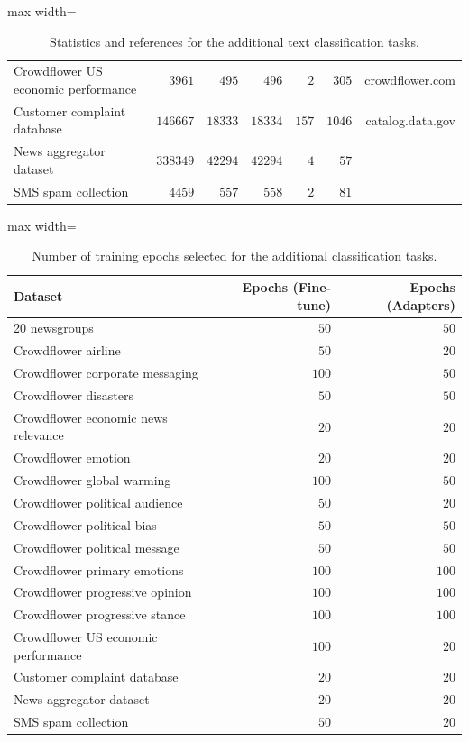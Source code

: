 \begin{table}[ht]
\begin{adjustbox}{max width=\textwidth}
\begin{tabular}{l|rrrrrr}
Crowdflower US economic performance & $3961$ & $495$ & $496$ & $2$ & $305$ & crowdflower.com \\
Customer complaint database & $146667$ & $18333$ & $18334$ & $157$ & $1046$ & catalog.data.gov \\
News aggregator dataset & $338349$ & $42294$ & $42294$ & $4$ & $57$ & \citep{Lichman:2013}\\
SMS spam collection & $4459$ & $557$ & $558$ & $2$ & $81$ & \citep{Almeida:2011:CSS:2034691.2034742}\\
\bottomrule
\end{tabular}
\end{adjustbox}
\caption{Statistics and references for the additional text classification tasks.}
\label{tab:hub_stats}
\end{table}


\begin{table}[ht]
\centering
\begin{adjustbox}{max width=\textwidth}
\begin{tabular}{l|rr}
\toprule
Dataset & Epochs (Fine-tune) & Epochs (Adapters) \\
\midrule
20 newsgroups & $50$ & $50$ \\
Crowdflower airline & $50$ & $20$ \\
Crowdflower corporate messaging & $100$ & $50$ \\
Crowdflower disasters & $50$ & $50$ \\
Crowdflower economic news relevance & $20$ & $20$ \\
Crowdflower emotion & $20$ & $20$ \\
Crowdflower global warming & $100$ & $50$ \\
Crowdflower political audience & $50$ & $20$ \\
Crowdflower political bias & $50$ & $50$ \\
Crowdflower political message & $50$ & $50$ \\
Crowdflower primary emotions & $100$ & $100$ \\
Crowdflower progressive opinion & $100$ & $100$ \\
Crowdflower progressive stance & $100$ & $100$ \\
Crowdflower US economic performance & $100$ & $20$ \\
Customer complaint database & $20$ & $20$ \\
News aggregator dataset & $20$ & $20$ \\
SMS spam collection & $50$ & $20$ \\
\bottomrule
\end{tabular}
\end{adjustbox}
\caption{Number of training epochs selected for the additional classification tasks.}
\label{tab:hub_epochs}
\end{table}


